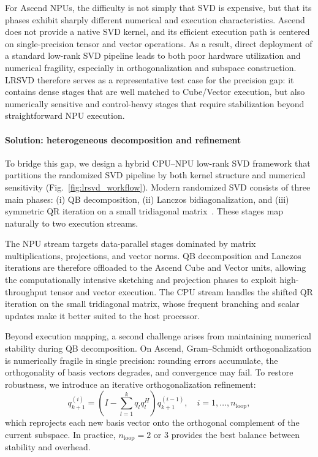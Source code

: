 \documentclass{article}
\newcommand{\rev}[1]{#1}
\begin{document}
For Ascend NPUs, the difficulty is not simply that SVD is expensive, but that its phases exhibit sharply different numerical and execution characteristics. Ascend does not provide a native SVD kernel, and its efficient execution path is centered on single-precision tensor and vector operations. As a result, direct deployment of a standard low-rank SVD pipeline leads to both poor hardware utilization and numerical fragility, especially in orthogonalization and subspace construction. LRSVD therefore serves as a representative test case for the precision gap: it contains dense stages that are well matched to Cube/Vector execution, but also numerically sensitive and control-heavy stages that require stabilization beyond straightforward NPU execution.

\paragraph{Solution: heterogeneous decomposition and refinement}
To bridge this gap, we design a hybrid CPU--NPU low-rank SVD framework that partitions the randomized SVD pipeline by both kernel structure and numerical sensitivity (Fig.~\ref{fig:lrsvd_workflow}). Modern randomized SVD consists of three main phases: (i) QB decomposition, (ii) Lanczos bidiagonalization, and (iii) symmetric QR iteration on a small tridiagonal matrix~\cite{xu2023fast}. These stages map naturally to two execution streams.

The NPU stream targets data-parallel stages dominated by matrix multiplications, projections, and vector norms. QB decomposition and Lanczos iterations are therefore offloaded to the Ascend Cube and Vector units, allowing the computationally intensive sketching and projection phases to exploit high-throughput tensor and vector execution. The CPU stream handles the shifted QR iteration on the small tridiagonal matrix, whose frequent branching and scalar updates make it better suited to the host processor.

\rev{Beyond execution mapping, a second challenge arises from maintaining numerical stability during QB decomposition.} On Ascend, Gram--Schmidt orthogonalization is numerically fragile in single precision: rounding errors accumulate, the orthogonality of basis vectors degrades, and convergence may fail. To restore robustness, we introduce an iterative orthogonalization refinement:
\begin{equation}
    q_{k+1}^{(i)} = \left(I - \sum_{l=1}^{k} q_l q_l^H \right) q_{k+1}^{(i-1)}, \quad i=1,\dots,n_{\text{loop}},
\end{equation}
which reprojects each new basis vector onto the orthogonal complement of the current subspace. In practice, $n_{\text{loop}}=2$ or $3$ provides the best balance between stability and overhead.
\end{document}
